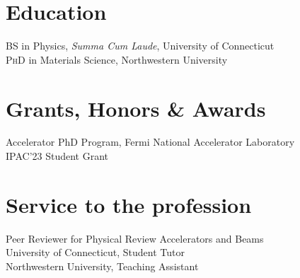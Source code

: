 \documentclass[11pt]{article} %
\begin{document}



\section*{Education}

\textsc{BS} in Physics, \emph{Summa Cum Laude}, University of Connecticut\\
\textsc{PhD} in Materials Science, Northwestern University


\section*{Grants, Honors \& Awards}

Accelerator PhD Program, Fermi National Accelerator Laboratory\\
IPAC'23 Student Grant





\section*{Service to the profession}

Peer Reviewer for Physical Review Accelerators and Beams\\
 University of Connecticut, Student Tutor\\
 Northwestern University, Teaching Assistant

\vfill %
\end{document}
